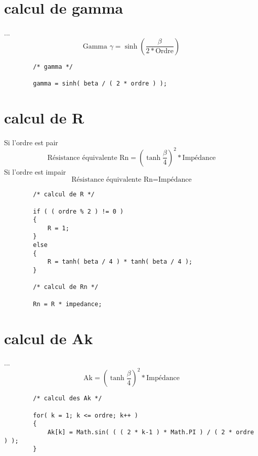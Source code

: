 \documentclass[a4paper,11pt]{article}
\begin{document}
\section{calcul de gamma}
    \paragraph{}
    ...\[ \mbox{Gamma } \gamma = \sinh( \frac{ \beta }{ 2 * \mbox{Ordre} } ) \]
    \begin{lstlisting}
        /* gamma */

        gamma = sinh( beta / ( 2 * ordre ) );

    \end{lstlisting}

\section{calcul de R}
    \paragraph{}
    Si l'ordre est pair \[ \mbox{Résistance équivalente Rn} = ( \tanh{ \frac{ \beta }{ 4 } } ) ^2 * \mbox{Impédance} \]
    Si l'ordre est impair \[ \mbox{Résistance équivalente Rn} = \mbox{Impédance} \]
    \begin{lstlisting}
        /* calcul de R */

        if ( ( ordre % 2 ) != 0 )
        {
            R = 1;
        }
        else
        {
            R = tanh( beta / 4 ) * tanh( beta / 4 );
        }

        /* calcul de Rn */

        Rn = R * impedance;

    \end{lstlisting}

\section{calcul de Ak }
    \paragraph{}
    ... \[ \mbox{Ak} = ( \tanh{ \frac{ \beta }{ 4 } } ) ^2 * \mbox{Impédance} \]
    \begin{lstlisting}
        /* calcul des Ak */

        for( k = 1; k <= ordre; k++ )
        {
            Ak[k] = Math.sin( ( ( 2 * k-1 ) * Math.PI ) / ( 2 * ordre ) );
        }

    \end{lstlisting}
\end{document}

